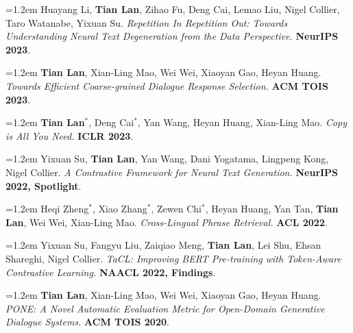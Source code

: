 \documentclass[10.5pt]{article}
\newcommand{\pubitem}[1]{\par\noindent\hangindent=1.2em\hangafter=1 #1\par\vspace{4pt}}
\newcommand{\venue}[1]{\textbf{\color{accent}#1}}
\begin{document}
\pubitem{Huayang Li, \textbf{Tian Lan}, Zihao Fu, Deng Cai, Lemao Liu, Nigel Collier, Taro Watanabe, Yixuan Su. \textit{Repetition In Repetition Out: Towards Understanding Neural Text Degeneration from the Data Perspective.} \venue{NeurIPS 2023}.}

\pubitem{\textbf{Tian Lan}, Xian-Ling Mao, Wei Wei, Xiaoyan Gao, Heyan Huang. \textit{Towards Efficient Coarse-grained Dialogue Response Selection.} \venue{ACM TOIS 2023}.}

\pubitem{\textbf{Tian Lan}$^{*}$, Deng Cai$^{*}$, Yan Wang, Heyan Huang, Xian-Ling Mao. \textit{Copy is All You Need.} \venue{ICLR 2023}.}

\pubitem{Yixuan Su, \textbf{Tian Lan}, Yan Wang, Dani Yogatama, Lingpeng Kong, Nigel Collier. \textit{A Contrastive Framework for Neural Text Generation.} \venue{NeurIPS 2022, Spotlight}.}

\pubitem{Heqi Zheng$^{*}$, Xiao Zhang$^{*}$, Zewen Chi$^{*}$, Heyan Huang, Yan Tan, \textbf{Tian Lan}, Wei Wei, Xian-Ling Mao. \textit{Cross-Lingual Phrase Retrieval.} \venue{ACL 2022}.}

\pubitem{Yixuan Su, Fangyu Liu, Zaiqiao Meng, \textbf{Tian Lan}, Lei Shu, Ehsan Shareghi, Nigel Collier. \textit{TaCL: Improving BERT Pre-training with Token-Aware Contrastive Learning.} \venue{NAACL 2022, Findings}.}

\pubitem{\textbf{Tian Lan}, Xian-Ling Mao, Wei Wei, Xiaoyan Gao, Heyan Huang. \textit{PONE: A Novel Automatic Evaluation Metric for Open-Domain Generative Dialogue Systems.} \venue{ACM TOIS 2020}.}
\end{document}
